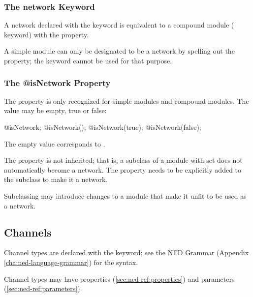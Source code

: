 \subsubsection{The network Keyword}
\label{sec:ned-ref:network-keyword}

A network declared with the  keyword is equivalent to a compound
module ( keyword) with the  property.

\begin{note}
    A simple module can only be designated to be a network by spelling out the
     property; the  keyword cannot
    be used for that purpose.
\end{note}

\subsubsection{The @isNetwork Property}
\label{sec:ned-ref:isnetwork-property}

The  property is only recognized for simple modules and
compound modules. The value may be empty, true or false:

\begin{ned}
@isNetwork;
@isNetwork();
@isNetwork(true);
@isNetwork(false);
\end{ned}

The empty value corresponds to .

The  property is not inherited; that is, a subclass
of a module with  set does not automatically become a network.
The  property needs to be explicitly added to the subclass
to make it a network.

\begin{rationale}
    Subclassing may introduce changes to a module that make it unfit to be used
    as a network.
\end{rationale}



\subsection{Channels}
\label{sec:ned-ref:channels}

Channel types are declared with the  keyword;
see the NED Grammar (Appendix \ref{cha:ned-language-grammar}) for the
syntax.

Channel types may have properties (\ref{sec:ned-ref:properties})
and parameters (\ref{sec:ned-ref:parameters}).

